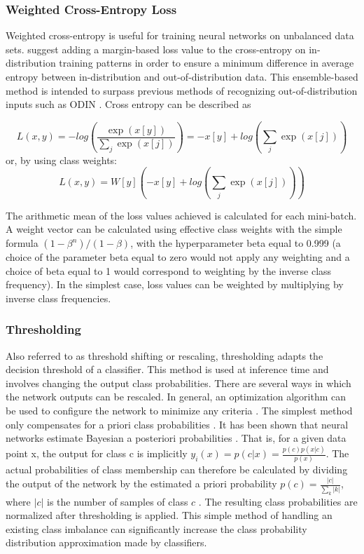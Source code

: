 \documentclass[journal]{IEEEtran}
\begin{document}
\subsubsection{Weighted Cross-Entropy Loss}
Weighted cross-entropy \cite{ronneberger2015u} is useful for training neural networks on unbalanced data sets. \cite{vyas2018out} suggest adding a margin-based loss value to the cross-entropy on in-distribution training patterns in order to ensure a minimum difference in average entropy between in-distribution and out-of-distribution data. This ensemble-based method is intended to surpass previous methods of recognizing out-of-distribution inputs such as ODIN \cite{liang2017enhancing}. Cross entropy can be described as

\small $$  L(x,y) = -log\left(\frac{\exp(x[y])}{\sum_{j}\exp(x[j])}\right)
= -x[y] + log\left(\underset{j}{\sum}\exp(x[j])\right)  $$
\normalsize or, by using class weights:
\small $$ L(x,y)=W[y]\left(-x[y]+log\left(\underset{j}{\sum}\exp(x[j])\right)\right) $$
\normalsize

The arithmetic mean of the loss values achieved is calculated for each mini-batch. A weight vector can be calculated using effective class weights \cite{cui2019class} with the simple formula
$ (1- \beta ^{n}) / (1- \beta) $,
with the hyperparameter beta equal to 0.999 (a choice of the parameter beta equal to zero would not apply any weighting and a choice of beta equal to 1 would correspond to weighting by the inverse class frequency). In the simplest case, loss values can be weighted by multiplying by inverse class frequencies.

\subsubsection{Thresholding}
Also referred to as threshold shifting or rescaling, thresholding adapts the decision threshold of a classifier. This method is used at inference time and involves changing the output class probabilities. There are several ways in which the network outputs can be rescaled. In general, an optimization algorithm can be used to configure the network to minimize any criteria \cite{lawrence1998neural}. The simplest method only compensates for a priori class probabilities \cite{richard1991neural}. It has been shown that neural networks estimate Bayesian a posteriori probabilities \cite{richard1991neural}. That is, for a given data point x, the output for class c is implicitly
$ y_{i}(x)=p(c|x)=\frac{p(c)p(x|c)}{p(x)} $.
The actual probabilities of class membership can therefore be calculated by dividing the output of the network by the estimated a priori probability
$  p(c)=\frac{|c|}{\sum_{k}|k|} $,
where $|c|$ is the number of samples of class $c$ \cite{buda2018systematic}. The resulting class probabilities are normalized after thresholding is applied. This simple method of handling an existing class imbalance can significantly increase the class probability distribution approximation made by classifiers.
\end{document}
